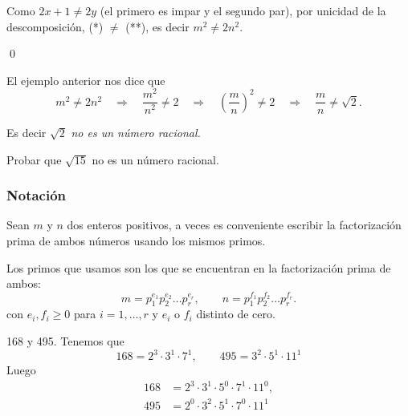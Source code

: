 \documentclass{beamer}
\begin{document}
    
    \begin{frame}
        Como $2x+1 \ne 2y$ (el primero es impar y el segundo par), por unicidad de la descomposición, (*) $\ne$ (**), es decir $m^2 \not=2n^2$.
        
        \qed

        \begin{observacion}
            El  ejemplo anterior nos dice que 
            $$
            m^2 \not=2n^2\quad \Rightarrow \quad \frac{m^2}{n^2}\not=2 \quad \Rightarrow \quad \left(\frac{m}{n}\right)^2\not=2 \quad \Rightarrow \quad \frac{m}{n}\not=\sqrt{2}. 
            $$
            
            Es decir $\sqrt{2}$ \textit{no es un número racional.}
        \end{observacion}

        \begin{ejercicio} Probar que $\sqrt{15}$ no es un número racional.
        \end{ejercicio}

    \end{frame}
    
    \begin{frame}\frametitle{Notación}
        
        Sean $m$ y $n$ dos enteros positivos, a veces es conveniente escribir la factorización prima de ambos números usando los mismos primos.
        
        Los primos que usamos son los que se encuentran en la factorización prima de ambos:
        $$
        m=p_1^{e_1}p_2^{e_2}\ldots p_r^{e_r},\qquad
        n=p_1^{f_1}p_2^{f_2}\ldots p_r^{f_r}.
        $$
        con $e_i,f_i \ge 0$ para $i=1,\ldots,r$ y $e_i$ o $f_i$ distinto de cero. 
        \pause
        \begin{ejemplo}
            168 y 495. \pause Tenemos que
            \begin{equation*}
                168 = 2^3 \cdot 3^1 \cdot 7^1, \qquad 495 = 3^2 \cdot 5^1 \cdot 11^1
            \end{equation*}
            Luego 
            \begin{align*}
                168 &= 2^3 \cdot 3^1 \cdot 5^0\cdot 7^1\cdot 11^0, \\
                495 &= 2^0 \cdot3^2 \cdot 5^1 \cdot 7^0 \cdot 11^1
            \end{align*}
        \end{ejemplo}
        
    \end{frame}
    
\end{document}
